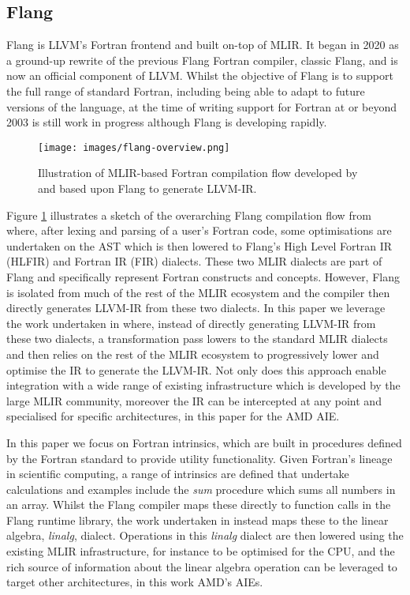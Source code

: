 \subsection{Flang}

Flang \cite{flang} is LLVM's Fortran frontend and built on-top of MLIR. It began in 2020 as a ground-up rewrite of the previous Flang Fortran compiler, classic Flang, and is now an official component of LLVM. Whilst the objective of Flang is to support the full range of standard Fortran, including being able to adapt to future versions of the language, at the time of writing support for Fortran at or beyond 2003 is still work in progress although Flang is developing rapidly.

\begin{figure}[htb]
\centering
 \texttt{[image: images/flang-overview.png]}
\caption{Illustration of MLIR-based Fortran compilation flow developed by \cite{brown2024fully} and based upon Flang to generate LLVM-IR.}	
\label{fig:flang-flow}
\end{figure}

Figure \ref{fig:flang-flow} illustrates a sketch of the overarching Flang compilation flow from \cite{brown2024fully} where, after lexing and parsing of a user's Fortran code, some optimisations are undertaken on the AST which is then lowered to Flang's High Level Fortran IR (HLFIR) \cite{hlfir} and Fortran IR (FIR) \cite{fir} dialects. These two MLIR dialects are part of Flang and specifically represent Fortran constructs and concepts. However, Flang is isolated from much of the rest of the MLIR ecosystem and the compiler then directly generates LLVM-IR from these two dialects. In this paper we leverage the work undertaken in \cite{brown2024fully} where, instead of directly generating LLVM-IR from these two dialects, a transformation pass lowers to the standard MLIR dialects and then relies on the rest of the MLIR ecosystem to progressively lower and optimise the IR to generate the LLVM-IR. Not only does this approach enable integration with a wide range of existing infrastructure which is developed by the large MLIR community, moreover the IR can be intercepted at any point and specialised for specific architectures, in this paper for the AMD AIE. 

In this paper we focus on Fortran intrinsics, which are built in procedures defined by the Fortran standard to provide utility functionality. Given Fortran's lineage in scientific computing, a range of intrinsics are defined that undertake calculations and examples include the \emph{sum} procedure which sums all numbers in an array. Whilst the Flang compiler maps these directly to function calls in the Flang runtime library, the work undertaken in \cite{brown2024fully} instead maps these to the linear algebra, \emph{linalg}, dialect. Operations in this \emph{linalg} dialect are then lowered using the existing MLIR infrastructure, for instance to be optimised for the CPU, and the rich source of information about the linear algebra operation can be leveraged to target other architectures, in this work AMD's AIEs.